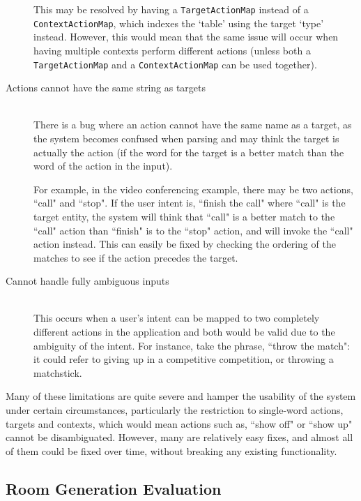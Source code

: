 \documentclass[11pt]{article}
\begin{document}
\begin{description}
	This may be resolved by having a \texttt{TargetActionMap} instead of a \texttt{ContextActionMap}, which indexes the `table' using the target `type' instead. However, this would mean that the same issue will occur when having multiple contexts perform different actions (unless both a \texttt{TargetActionMap} and a \texttt{ContextActionMap} can be used together).
\item[Actions cannot have the same string as targets] \hfill
	\\ There is a bug where an action cannot have the same name as a target, as the system becomes confused when parsing and may think the target is actually the action (if the word for the target is a better match than the word of the action in the input).
	
	For example, in the video conferencing example, there may be two actions, ``call" and ``stop". If the user intent is, ``finish the call" where ``call" is the target entity, the system will think that ``call" is a better match to the ``call" action than ``finish" is to the ``stop" action, and will invoke the ``call" action instead. This can easily be fixed by checking the ordering of the matches to see if the action precedes the target.
\item[Cannot handle fully ambiguous inputs] \hfill
	\\ This occurs when a user's intent can be mapped to two completely different actions in the application and both would be valid due to the ambiguity of the intent. For instance, take the phrase, ``throw the match": it could refer to giving up in a competitive competition, or throwing a matchstick.
\end{description}

Many of these limitations are quite severe and hamper the usability of the system under certain circumstances, particularly the restriction to single-word actions, targets and contexts, which would mean actions such as, ``show off" or ``show up" cannot be disambiguated. However, many are relatively easy fixes, and almost all of them could be fixed over time, without breaking any existing functionality.

\subsection{Room Generation Evaluation}
\end{document}
